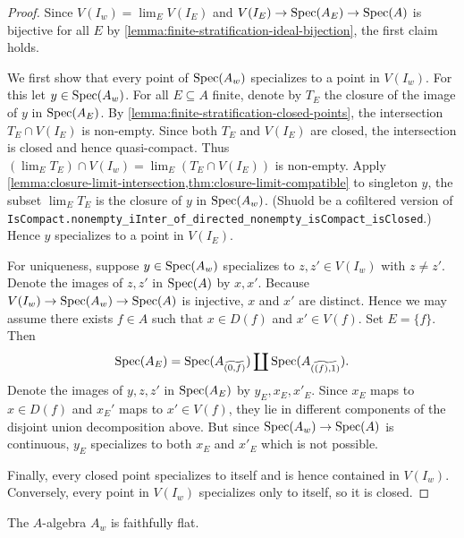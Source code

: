 \begin{proof}
    Since $V(I_w) = \lim_{E} V(I_E)$ and $V(I_E) \to \mathrm{Spec}(A_E) \to \mathrm{Spec}(A)$ is
    bijective for all $E$ by \ref{lemma:finite-stratification-ideal-bijection}, the
    first claim holds.

    We first show that every point of $\mathrm{Spec}(A_w)$ specializes to a point in $V(I_w)$.
    For this let $y \in \mathrm{Spec}(A_w)$. For all $E \subseteq A$ finite, denote by
    $T_E$ the closure of the image of $y$ in $\mathrm{Spec}(A_E)$. By
    \ref{lemma:finite-stratification-closed-points}, the intersection $T_E \cap V(I_E)$ is
    non-empty. Since both $T_E$ and $V(I_E)$ are closed, the intersection is closed
    and hence quasi-compact. Thus $(\lim_E T_E) \cap V(I_w) = \lim_E (T_E \cap V(I_E))$ is non-empty.
    Apply \ref{lemma:closure-limit-intersection,thm:closure-limit-compatible} to singleton \({y}\), the subset $\lim_E T_E$ is the closure of $y$ in $\mathrm{Spec}(A_w)$. (Shuold be a cofiltered version of \verb`IsCompact.nonempty_iInter_of_directed_nonempty_isCompact_isClosed`.) Hence
    $y$ specializes to a point in $V(I_E)$.

    For uniqueness, suppose $y \in \mathrm{Spec}(A_w)$ specializes to $z, z' \in V(I_w)$ with
    $z \neq z'$. Denote the images of $z, z'$ in $\mathrm{Spec}(A)$ by $x, x'$.
    Because $V(I_w) \to \mathrm{Spec}(A_w) \to \mathrm{Spec}(A)$ is injective, $x$ and $x'$ are distinct. Hence we may
    assume there exists $f \in A$ such that $x \in D(f)$ and $x' \in V(f)$. Set
    $E = \{f\}$. Then
    \[
        \mathrm{Spec}(A_E) = \mathrm{Spec}(A_{\widetilde{(0, f)}}) \coprod \mathrm{Spec}(A_{\widetilde{((f), 1)}})
    .\]
    Denote the images of $y, z, z'$ in $\mathrm{Spec}(A_E)$ by $y_E, x_E, x'_E$. Since
    $x_E$ maps to $x \in D(f)$ and $x_E'$ maps to $x' \in V(f)$, they lie
    in different components of the disjoint union decomposition above. But
    since $\mathrm{Spec}(A_w) \to \mathrm{Spec}(A)$ is continuous, $y_E$ specializes to both $x_E$ and $x'_E$
    which is not possible.

    Finally, every closed point specializes to itself and is hence contained in $V(I_{w})$. Conversely,
    every point in $V(I_{w})$ specializes only to itself, so it is closed.
\end{proof}

\begin{lemma}
    The $A$-algebra $A_w$ is faithfully flat.
    \label{lemma:w-localization-faithfully-flat}
\end{lemma}

